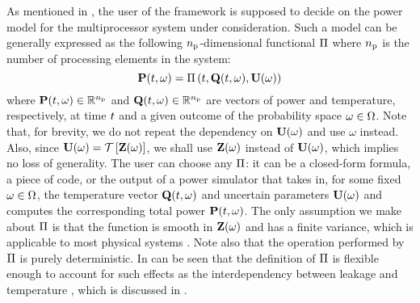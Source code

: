 As mentioned in , the user of the framework is supposed to decide on the power model for the multiprocessor system under consideration.
Such a model can be generally expressed as the following ${n_\text{p}}$-dimensional functional $\oPower$ where ${n_\text{p}}$ is the number of processing elements in the system:
\begin{equation} \elabel{power-model}
  \vP(\t, \o) = \oPower{\t, \vTO(\t, \o), \vU(\o)}
\end{equation}
where $\mathbf{P}(t, \omega) \in \mathbb{R}^{n_\text{p}}$ and $\mathbf{Q}(t, \omega) \in \mathbb{R}^{n_\text{p}}$ are vectors of power and temperature, respectively, at time $t$ and a given outcome of the probability space $\omega \in \Omega$.
Note that, for brevity, we do not repeat the dependency on $\mathbf{U}(\omega)$ and use $\omega$ instead.
Also, since $\vU(\o) = \oTransform{\vZ(\o)}$, we shall use $\mathbf{Z}(\omega)$ instead of $\mathbf{U}(\omega)$, which implies no loss of generality.
The user can choose any $\oPower$: it can be a closed-form formula, a piece of code, or the output of a power simulator that takes in, for some fixed $\omega \in \Omega$, the temperature vector $\mathbf{Q}(t, \omega)$ and uncertain parameters $\mathbf{U}(\omega)$ and computes the corresponding total power $\mathbf{P}(t, \omega)$.
The only assumption we make about $\oPower$ is that the function is smooth in $\mathbf{Z}(\omega)$ and has a finite variance, which is applicable to most physical systems \cite{xiu2010}.
Note also that the operation performed by $\oPower$ is purely deterministic.
In can be seen that the definition of $\oPower$ is flexible enough to account for such effects as the interdependency between leakage and temperature \cite{srivastava2010, liu2007}, which is discussed in .
